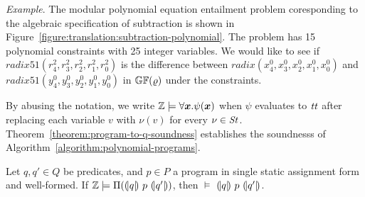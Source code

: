 \noindent
\emph{Example}.
The modular polynomial equation entailment problem coresponding to the
algebraic specification of subtraction is shown in
Figure~\ref{figure:translation:subtraction-polynomial}. The problem
has 15 polynomial constraints with 25 integer variables. We would like
to see if $\mathit{radix51}({r}^2_4, {r}^2_3, {r}^2_2,
{r}^2_1, {r}^2_0)$ is the difference between $\mathit{radix}({x}^0_4,
{x}^0_3, {x}^0_2, {x}^0_1, {x}^0_0)$ and $\mathit{radix51}({y}^0_4,
{y}^0_3, {y}^0_2, {y}^0_1, {y}^0_0)$ in $\mathbb{GF}(\varrho)$ under the
constraints. 


By abusing the notation, we write $\bbfZ \models \forall
\vx. \psi(\vx)$ when $\psi$ evaluates to $\mathit{tt}$ after replacing each
variable $v$ with $\nu(v)$ for every $\nu \in \mathit{St}$.
Theorem~\ref{theorem:program-to-q-soundness} establishes the
soundnesss of Algorithm~\ref{algorithm:polynomial-programs}.
\begin{theorem}
  \label{theorem:program-to-q-soundness}
  Let $q, q' \in Q$ be predicates, and $p \in P$ a program in single
  static assignment form and well-formed. 
  If $\mathbb{Z} \models \Pi({(\!|}{q}{|\!)}~{p}~{(\!|}{q'}{|\!)})$, then
  $\models$ ${(\!|}{q}{|\!)}~{p}~{(\!|}{q'}{|\!)}$.
\end{theorem}

